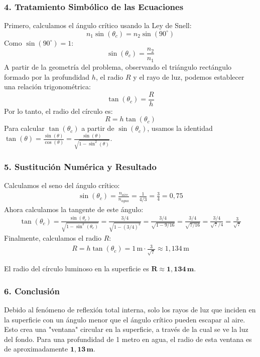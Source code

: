 \subsubsection*{4. Tratamiento Simbólico de las Ecuaciones}
Primero, calculamos el ángulo crítico usando la Ley de Snell:
$$n_1 \sin(\theta_c) = n_2 \sin(90^\circ)$$
Como $\sin(90^\circ)=1$:
$$\sin(\theta_c) = \frac{n_2}{n_1}$$
A partir de la geometría del problema, observando el triángulo rectángulo formado por la profundidad $h$, el radio $R$ y el rayo de luz, podemos establecer una relación trigonométrica:
$$\tan(\theta_c) = \frac{R}{h}$$
Por lo tanto, el radio del círculo es:
$$R = h \tan(\theta_c)$$
Para calcular $\tan(\theta_c)$ a partir de $\sin(\theta_c)$, usamos la identidad $\tan(\theta) = \frac{\sin(\theta)}{\cos(\theta)} = \frac{\sin(\theta)}{\sqrt{1-\sin^2(\theta)}}$.

\subsubsection*{5. Sustitución Numérica y Resultado}
Calculamos el seno del ángulo crítico:
\begin{gather}
    \sin(\theta_c) = \frac{n_{aire}}{n_{agua}} = \frac{1}{4/3} = \frac{3}{4} = 0,75
\end{gather}
Ahora calculamos la tangente de este ángulo:
\begin{gather}
    \tan(\theta_c) = \frac{\sin(\theta_c)}{\sqrt{1-\sin^2(\theta_c)}} = \frac{3/4}{\sqrt{1 - (3/4)^2}} = \frac{3/4}{\sqrt{1 - 9/16}} = \frac{3/4}{\sqrt{7/16}} = \frac{3/4}{\sqrt{7}/4} = \frac{3}{\sqrt{7}}
\end{gather}
Finalmente, calculamos el radio $R$:
\begin{gather}
    R = h \tan(\theta_c) = 1 \, \text{m} \cdot \frac{3}{\sqrt{7}} \approx 1,134 \, \text{m}
\end{gather}
\begin{cajaresultado}
    El radio del círculo luminoso en la superficie es $\boldsymbol{R \approx 1,134 \, \textbf{m}}$.
\end{cajaresultado}

\subsubsection*{6. Conclusión}
\begin{cajaconclusion}
Debido al fenómeno de reflexión total interna, solo los rayos de luz que inciden en la superficie con un ángulo menor que el ángulo crítico pueden escapar al aire. Esto crea una "ventana" circular en la superficie, a través de la cual se ve la luz del fondo. Para una profundidad de 1 metro en agua, el radio de esta ventana es de aproximadamente $\mathbf{1,13 \, m}$.
\end{cajaconclusion}

